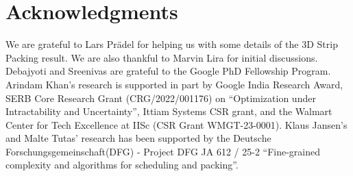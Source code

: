 
%
\section{Acknowledgments}
We are grateful to Lars Pr\"{a}del for helping us with some details of the 3D Strip Packing result.
We are also thankful to Marvin Lira for initial discussions.
Debajyoti and Sreenivas are grateful to the Google PhD Fellowship Program. Arindam Khan's research is supported in part by Google India Research Award, SERB Core Research Grant
(CRG/2022/001176) on \textquotedblleft{}Optimization under Intractability and Uncertainty\textquotedblright{}, Ittiam Systems CSR grant, and the Walmart
Center for Tech Excellence at IISc (CSR Grant WMGT-23-0001). 
Klaus Jansen's and Malte Tutas' research has been supported by the Deutsche Forschungsgemeinschaft(DFG) - Project DFG JA 612 / 25-2 ``Fine-grained complexity and algorithms for scheduling and packing''.
